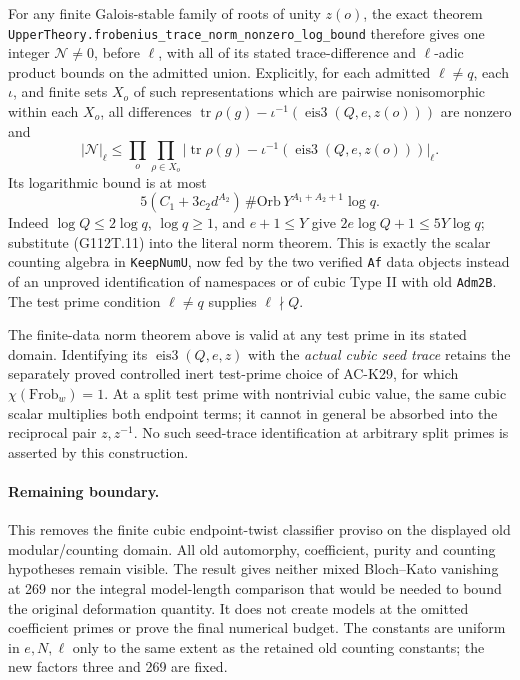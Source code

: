 For any finite Galois-stable family of roots of unity \(z(o)\),
the exact theorem
\texttt{UpperTheory.frobenius\_trace\_norm\_nonzero\_log\_bound}
therefore gives one integer \(\mathcal N\ne0\), before \(\ell\),
with all of its stated trace-difference and \(\ell\)-adic product
bounds on the admitted union.  Explicitly, for each admitted
\(\ell\ne q\), each \(\iota\), and finite sets \(X_o\) of such
representations which are pairwise nonisomorphic within each \(X_o\),
all differences
\(\operatorname{tr}\rho(g)-\iota^{-1}(\operatorname{eis3}(Q,e,z(o)))\)
are nonzero and
\[
 |\mathcal N|_\ell\le
 \prod_o\prod_{\rho\in X_o}
 \bigl|\operatorname{tr}\rho(g)-
       \iota^{-1}(\operatorname{eis3}(Q,e,z(o)))\bigr|_\ell.
                                                        \tag{G112T.11a}
\]
Its logarithmic bound is at most
\[
 5(C_1+3c_2d^{A_2})\,\#\mathrm{Orb}\,
              Y^{A_1+A_2+1}\log q.
                                                        \tag{G112T.12}
\]
Indeed \(\log Q\le2\log q\), \(\log q\ge1\), and \(e+1\le Y\)
give \(2e\log Q+1\le5Y\log q\); substitute (G112T.11) into the
literal norm theorem.  This is exactly the scalar counting algebra
in \texttt{KeepNumU}, now fed by the two verified \texttt{Af} data
objects instead of an unproved identification of namespaces or of
cubic Type II with old \texttt{Adm2B}.  The test prime condition
\(\ell\ne q\) supplies \(\ell\nmid Q\).

The finite-data norm theorem above is valid at any test prime in its
stated domain.  Identifying its \(\operatorname{eis3}(Q,e,z)\) with
the \emph{actual cubic seed trace} retains the separately proved
controlled inert test-prime choice of AC-K29, for which
\(\chi(\mathrm{Frob}_w)=1\).  At a split test prime with nontrivial
cubic value, the same cubic scalar multiplies both endpoint terms;
it cannot in general be absorbed into the reciprocal pair
\(z,z^{-1}\).  No such seed-trace identification at arbitrary split
primes is asserted by this construction.

\paragraph{Remaining boundary.}
This removes the finite cubic endpoint-twist classifier proviso on
the displayed old modular/counting domain.  All old automorphy,
coefficient, purity and counting hypotheses remain visible.  The
result gives neither mixed Bloch--Kato vanishing at 269 nor the
integral model-length comparison that would be needed to bound the
original deformation quantity.  It does not create models at the
omitted coefficient primes or prove the final numerical budget.
The constants are uniform in \(e,N,\ell\) only to the same extent
as the retained old counting constants; the new factors three and
269 are fixed.

